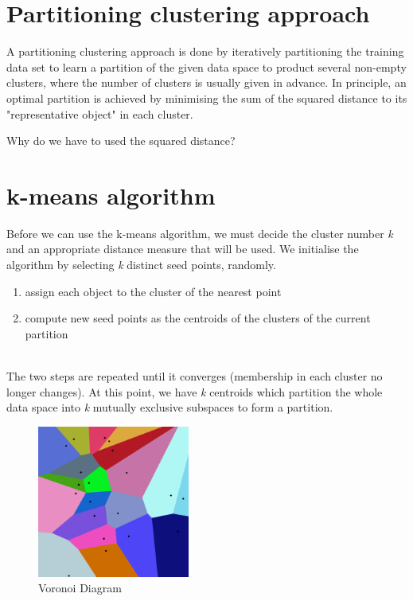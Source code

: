 \documentclass[11pt,fleqn]{book} %
\begin{document}
\section{Partitioning clustering approach}
A partitioning clustering approach is done by iteratively partitioning the training data set to learn a partition of the given data space to product several non-empty clusters, where the number of clusters is usually given in advance. In principle, an optimal partition is achieved by minimising the sum of the squared distance to its "representative object" in each cluster.

\begin{exercise}
Why do we have to used the squared distance?
\end{exercise}

\section{k-means algorithm}
Before we can use the k-means algorithm, we must decide the cluster number \textit{k} and an appropriate distance measure that will be used. We initialise the algorithm by selecting \textit{k} distinct seed points, randomly.\\

\begin{enumerate}
	\item assign each object to the cluster of the nearest point
	\item compute new seed points as the centroids of the clusters of the current partition
\end{enumerate}

\ \\ \noindent
The two steps are repeated until it converges (membership in each cluster no longer changes). At this point, we have \textit{k} centroids which partition the whole data space into \textit{k} mutually exclusive subspaces to form a partition.\\

\begin{figure}[h]
	\centering
  	\includegraphics[width=50mm, scale=0.7]{Pictures/voronoi}
  	\caption{Voronoi Diagram}
\end{figure}
\end{document}
